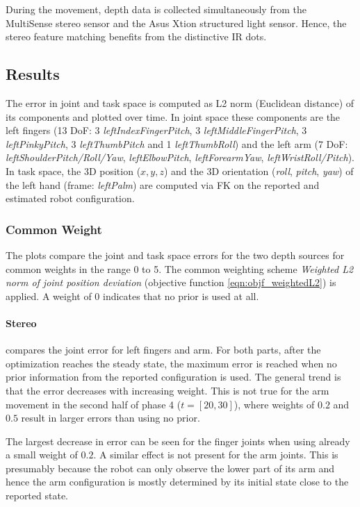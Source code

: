 During the movement, depth data is collected simultaneously from the MultiSense stereo sensor and the Asus Xtion structured light sensor. Hence, the stereo feature matching benefits from the distinctive IR dots.

\subsection{Results}

The error in joint and task space is computed as L2 norm (Euclidean distance) of its components and plotted over time. In joint space these components are the left fingers (13 DoF: 3 \emph{leftIndexFingerPitch}, 3 \emph{leftMiddleFingerPitch}, 3 \emph{leftPinkyPitch}, 3 \emph{leftThumbPitch} and 1 \emph{leftThumbRoll}) and the left arm (7 DoF: \emph{leftShoulderPitch/Roll/Yaw}, \emph{leftElbowPitch}, \emph{leftForearmYaw}, \emph{leftWristRoll/Pitch}). In task space, the 3D position ($x,y,z$) and the 3D orientation (\textit{roll}, \textit{pitch}, \textit{yaw}) of the left hand (frame: \emph{leftPalm}) are computed via FK on the reported and estimated robot configuration.

\subsubsection{Common Weight}

The plots compare the joint and task space errors for the two depth sources for common weights in the range 0 to 5. The common weighting scheme \emph{Weighted L2 norm of joint position deviation} (objective function \cref{eqn:objf_weightedL2}) is applied. A weight of 0 indicates that no prior is used at all.

\paragraph{Stereo}

 compares the joint error for left fingers and arm. For both parts, after the optimization reaches the steady state, the maximum error is reached when no prior information from the reported configuration is used.
The general trend is that the error decreases with increasing weight. This is not true for the arm movement in the second half of phase 4 ($t=[20,30]$), where weights of $0.2$ and $0.5$ result in larger errors than using no prior.

The largest decrease in error can be seen for the finger joints when using already a small weight of $0.2$. A similar effect is not present for the arm joints. This is presumably because the robot can only observe the lower part of its arm and hence the arm configuration is mostly determined by its initial state close to the reported state.


